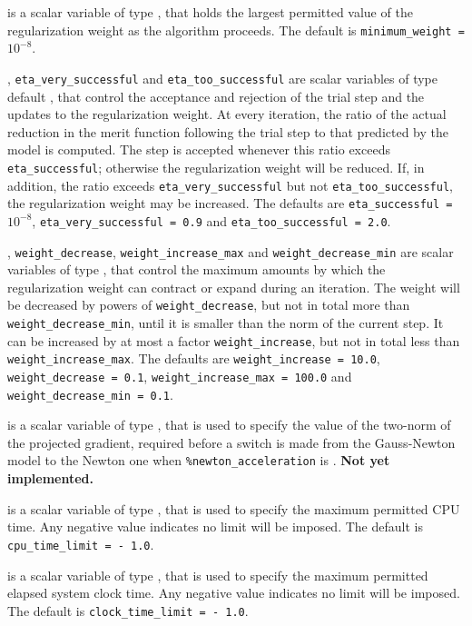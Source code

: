 \documentclass{galahad}
\newcommand{\packagename}{SNLS}
\newcommand{\fullpackagename}{\libraryname\_\packagename}
\newcommand{\solver}{{\tt \fullpackagename\_solve}}
\begin{document}
\begin{description}
 is a scalar variable of type \realdp, that holds
the largest permitted value of the regularization weight as the algorithm
proceeds.
The default is {\tt minimum\_weight =} $10^{-8}$.

, {\tt eta\_very\_successful}
and {\tt eta\_too\_successful}
are scalar variables of type default
\realdp, that control the acceptance and rejection of the trial step
and the updates to the regularization weight.
At every iteration, the ratio of the actual reduction in the merit function
following the trial step to that predicted by the model is computed.
The step is accepted whenever this ratio exceeds {\tt eta\_successful};
otherwise the regularization weight will be reduced.
If, in addition, the ratio exceeds {\tt eta\_very\_successful} but not
{\tt eta\_too\_successful}, the regularization weight may be increased.
The defaults are
{\tt eta\_successful =} $10^{-8}$,
{\tt eta\_very\_successful = 0.9} and
{\tt eta\_too\_successful = 2.0}.

,
{\tt weight\_decrease},
{\tt weight\_increase\_max}
and
{\tt weight\_decrease\_min}
are scalar variables of type \realdp, that
control the maximum amounts by which the regularization weight can
contract or expand during an iteration. The weight will be decreased by
powers of {\tt weight\_decrease}, but not in total
more than  {\tt weight\_decrease\_min}, until it is smaller than the norm of
the current step.
It can be increased by at most a factor {\tt weight\_increase}, but not
in total less than {\tt weight\_increase\_max}.
The defaults are
{\tt weight\_increase = 10.0},
{\tt weight\_decrease = 0.1},
{\tt weight\_incr\-ease\_max = 100.0} and
{\tt weight\_decrease\_min = 0.1}.

 is a scalar variable of type \realdp,
that is used to specify the value of the two-norm of the projected gradient,
required before a switch is made from the Gauss-Newton model to the Newton 
one when {\tt \%newton\_acceleration} is \true.
{\bf Not yet implemented.}

 is a scalar variable of type \realdp,
that is used to specify the maximum permitted CPU time. Any negative
value indicates no limit will be imposed. The default is
{\tt cpu\_time\_limit = - 1.0}.

 is a scalar variable of type \realdp,
that is used to specify the maximum permitted elapsed system clock time.
Any negative value indicates no limit will be imposed. The default is
{\tt clock\_time\_limit = - 1.0}.


\end{description}
\end{document}
